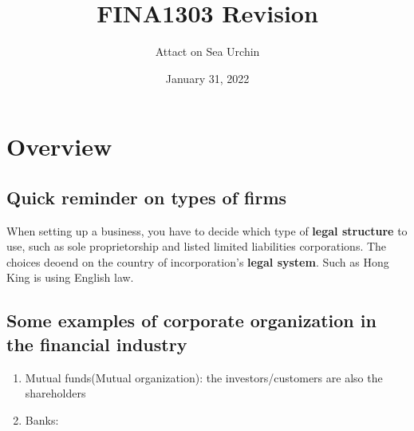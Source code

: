 \documentclass{report}
\title{FINA1303 Revision}
\author{Attact on Sea Urchin}
\date{January 31, 2022}
\begin{document}
\maketitle
\tableofcontents
\chapter{Overview}
\section{Quick reminder on types of firms}
When setting up a business, you have to decide which type of \textbf{legal structure} to use, such as sole proprietorship and listed limited liabilities corporations. The choices deoend on the country of incorporation's \textbf{legal system}. Such as Hong King is using English law.

\section{Some examples of corporate organization in the financial industry}
\begin{enumerate}
    \item Mutual funds(Mutual organization): the investors/customers are also the shareholders
    \item Banks: 
\end{enumerate}
\end{document}
